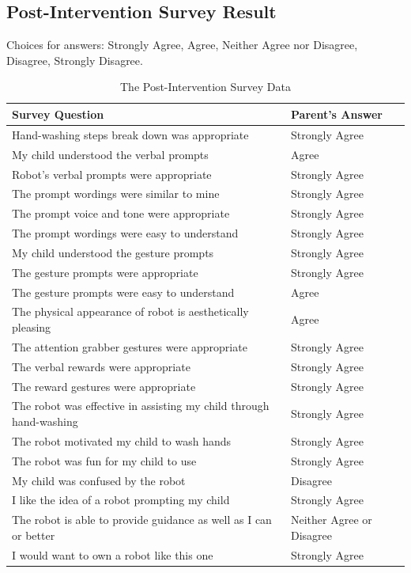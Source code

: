 \documentclass{ut-thesis}
\begin{document}
\begin{appendices}
\chapter{Post-Intervention Survey Result}
Choices for answers: Strongly Agree, Agree, Neither Agree nor Disagree, Disagree, Strongly Disagree.
\begin{table}[H]
	\centering
	\begin{tabular}{ | p{12cm} | l | }
		\hline
		\textbf{Survey Question}	&	\textbf{Parent's Answer}	\\	\hline	\hline		
		Hand-washing steps break down was appropriate	&	Strongly Agree	\\	\hline
		My child understood the verbal prompts	&	Agree	\\	\hline
		Robot's verbal prompts were appropriate	&	Strongly Agree	\\	\hline
		The prompt wordings were similar to mine	&	Strongly Agree	\\	\hline
		The prompt voice and tone were appropriate	&	Strongly Agree	\\	\hline
		The prompt wordings were easy to understand	&	Strongly Agree \\	\hline
		My child understood the gesture prompts	&	Strongly Agree	\\	\hline
		The gesture prompts were appropriate	&	Strongly Agree	\\	\hline
		The gesture prompts were easy to understand	&	Agree	\\	\hline
		The physical appearance of robot is aesthetically pleasing	&	Agree	\\	\hline
		The attention grabber gestures were appropriate	&	Strongly Agree	\\	\hline
		The verbal rewards were appropriate	&	Strongly Agree	\\	\hline
		The reward gestures were appropriate	&	Strongly Agree	\\	\hline
		The robot was effective in assisting my child through hand-washing	&	Strongly Agree	\\	\hline
		The robot motivated my child to wash hands	&	Strongly Agree	\\	\hline
		The robot was fun for my child to use	&	Strongly Agree	\\	\hline
		My child was confused by the robot	&	Disagree	\\	\hline
		I like the idea of a robot prompting my child	&	Strongly Agree	\\	\hline
		The robot is able to provide guidance as well as I can or better	&	Neither Agree or Disagree	\\	\hline
		I would want to own a robot like this one	&	Strongly Agree	\\	\hline
	\end{tabular}
	\caption{The Post-Intervention Survey Data}
	\label{tab:PostInterventionSurveyData}
\end{table}

\end{appendices}
\end{document}
